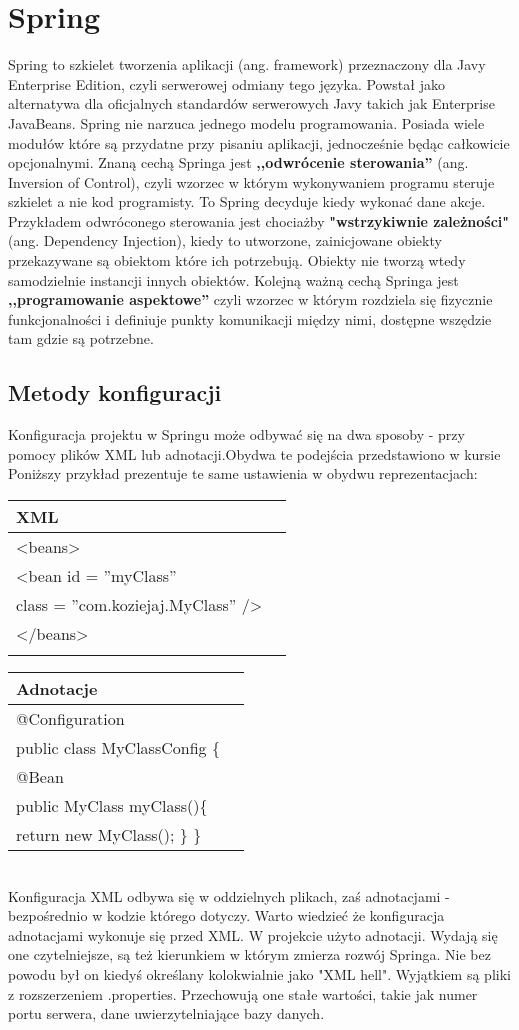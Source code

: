 \documentclass[a4paper,12pt,twoside,openany]{report}
\begin{document}
\chapter{Spring}
Spring to szkielet tworzenia aplikacji (ang. framework) przeznaczony dla Javy Enterprise Edition, czyli serwerowej odmiany tego języka. Powstał jako alternatywa dla oficjalnych standardów serwerowych Javy takich jak Enterprise JavaBeans. Spring nie narzuca jednego modelu programowania. Posiada wiele modułów które są przydatne przy pisaniu aplikacji, jednocześnie będąc całkowicie opcjonalnymi. Znaną cechą Springa jest \textbf{,,odwrócenie sterowania''} (ang. Inversion of Control), czyli wzorzec w którym wykonywaniem programu steruje szkielet a nie kod programisty. To Spring decyduje kiedy wykonać dane akcje. Przykładem odwróconego sterowania jest chociażby \textbf{"wstrzykiwnie zależności"} (ang. Dependency Injection), kiedy to utworzone, zainicjowane obiekty przekazywane są obiektom które ich potrzebują. Obiekty nie tworzą wtedy samodzielnie instancji innych obiektów. Kolejną ważną cechą Springa jest \textbf{,,programowanie aspektowe''} czyli wzorzec w którym rozdziela się fizycznie funkcjonalności i definiuje punkty komunikacji między nimi, dostępne wszędzie tam gdzie są potrzebne.
\section{Metody konfiguracji}
Konfiguracja projektu w Springu może odbywać się na dwa sposoby - przy pomocy plików XML lub adnotacji.Obydwa te podejścia przedstawiono w kursie \cite{Spring2}  Poniższy przykład prezentuje te same ustawienia w obydwu reprezentacjach:\\
\begin{tabular}{|l|l|}
	\hline XML\\ 
	\hline <beans> \\
	<bean id = ''myClass'' \\ class = ''com.koziejaj.MyClass'' />\\
	</beans>\\ \\
	\hline 
\end{tabular} 
\begin{tabular}{|l|l|}
	\hline Adnotacje\\ 
	\hline @Configuration\\
	public class MyClassConfig \{\\
	@Bean \\
	public MyClass myClass()\{\\
	return new MyClass();
	\}
	\}\\
	\hline 
\end{tabular}\\
Konfiguracja XML odbywa się w oddzielnych plikach, zaś adnotacjami - bezpośrednio w kodzie którego dotyczy. Warto wiedzieć że konfiguracja adnotacjami wykonuje się przed XML. W projekcie użyto adnotacji. Wydają się one czytelniejsze, są też kierunkiem w którym zmierza rozwój Springa. Nie bez powodu był on kiedyś określany kolokwialnie jako "XML hell". Wyjątkiem są pliki z rozszerzeniem .properties. Przechowują one stałe wartości, takie jak numer portu serwera, dane uwierzytelniające bazy danych.
\end{document}
